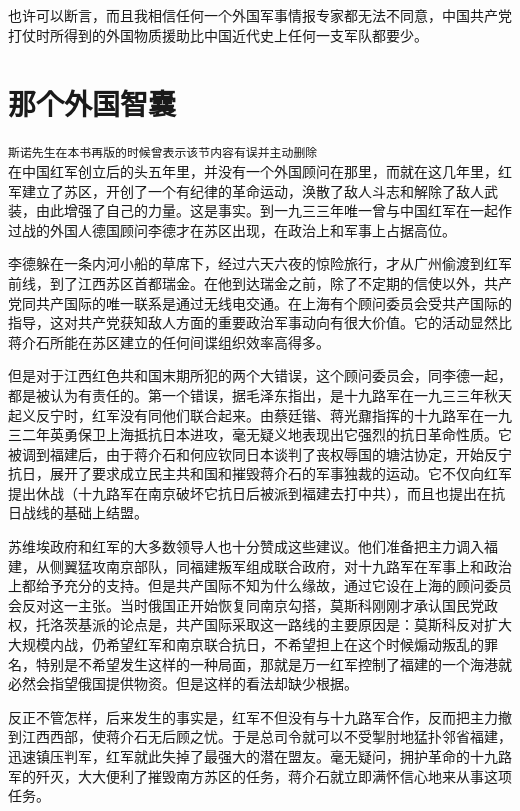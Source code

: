 \documentclass[10pt]{book}
\begin{document}
也许可以断言，而且我相信任何一个外国军事情报专家都无法不同意，中国共产党打仗时所得到的外国物质援助比中国近代史上任何一支军队都要少。



\section{那个外国智囊}

\texttt{斯诺先生在本书再版的时候曾表示该节内容有误并主动删除}
~\\

在中国红军创立后的头五年里，并没有一个外国顾问在那里，而就在这几年里，红军建立了苏区，开创了一个有纪律的革命运动，涣散了敌人斗志和解除了敌人武装，由此增强了自己的力量。这是事实。到一九三三年唯一曾与中国红军在一起作过战的外国人德国顾问李德才在苏区出现，在政治上和军事上占据高位。

李德躲在一条内河小船的草席下，经过六天六夜的惊险旅行，才从广州偷渡到红军前线，到了江西苏区首都瑞金。在他到达瑞金之前，除了不定期的信使以外，共产党同共产国际的唯一联系是通过无线电交通。在上海有个顾问委员会受共产国际的指导，这对共产党获知敌人方面的重要政治军事动向有很大价值。它的活动显然比蒋介石所能在苏区建立的任何间谍组织效率高得多。

但是对于江西红色共和国末期所犯的两个大错误，这个顾问委员会，同李德一起，都是被认为有责任的。第一个错误，据毛泽东指出，是十九路军在一九三三年秋天起义反宁时，红军没有同他们联合起来。由蔡廷锴、蒋光鼐指挥的十九路军在一九三二年英勇保卫上海抵抗日本进攻，毫无疑义地表现出它强烈的抗日革命性质。它被调到福建后，由于蒋介石和何应钦同日本谈判了丧权辱国的塘沽协定，开始反宁抗日，展开了要求成立民主共和国和摧毁蒋介石的军事独裁的运动。它不仅向红军提出休战（十九路军在南京破坏它抗日后被派到福建去打中共），而且也提出在抗日战线的基础上结盟。

苏维埃政府和红军的大多数领导人也十分赞成这些建议。他们准备把主力调入福建，从侧翼猛攻南京部队，同福建叛军组成联合政府，对十九路军在军事上和政治上都给予充分的支持。但是共产国际不知为什么缘故，通过它设在上海的顾问委员会反对这一主张。当时俄国正开始恢复同南京勾搭，莫斯科刚刚才承认国民党政权，托洛茨基派的论点是，共产国际采取这一路线的主要原因是：莫斯科反对扩大大规模内战，仍希望红军和南京联合抗日，不希望担上在这个时候煽动叛乱的罪名，特别是不希望发生这样的一种局面，那就是万一红军控制了福建的一个海港就必然会指望俄国提供物资。但是这样的看法却缺少根据。

反正不管怎样，后来发生的事实是，红军不但没有与十九路军合作，反而把主力撤到江西西部，使蒋介石无后顾之忧。于是总司令就可以不受掣肘地猛扑邻省福建，迅速镇压判军，红军就此失掉了最强大的潜在盟友。毫无疑问，拥护革命的十九路军的歼灭，大大便利了摧毁南方苏区的任务，蒋介石就立即满怀信心地来从事这项任务。
\end{document}
